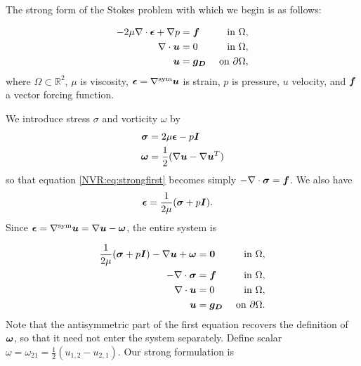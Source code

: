 The strong form of the Stokes problem with which we begin is as follows:

\begin{align}
- 2 \mu \NVRdiv \NVRtensor{\epsilon} + \NVRgrad p &= \vect{f} & \text{ in } \Omega, \label{NVR:eq:strongfirst} \\
\NVRdiv \vect{u} &= 0 & \text{ in } \Omega, \\
\vect{u} &= \vect{g_{D}} & \text{ on } \partial\Omega,\label{NVR:eq:stronglast}
\end{align}
where $\Omega \subset \mathbb{R}^{2}$, $\mu$ is viscosity, $\NVRtensor{\epsilon}=\NVRgrad^{\text{sym}} \vect{u}$ is strain, $p$ is pressure, $u$ velocity, and $\vect{f}$ a vector forcing function.

We introduce stress $\sigma$ and vorticity $\omega$ by
\begin{align*}
\NVRtensor{\sigma} &= 2 \mu \NVRtensor{\epsilon} - p\NVRtensor{I}\\
\NVRtensor{\omega} &= \frac{1}{2}(\NVRgrad \vect{u} - \NVRgrad \vect{u}^{T})
\end{align*}
so that equation \eqref{NVR:eq:strongfirst} becomes simply $-\NVRdiv \NVRtensor{\sigma} = \vect{f}$.
We also have
\begin{align*}
\NVRtensor{\epsilon} &= \frac{1}{2 \mu}(\NVRtensor{\sigma} + p\NVRtensor{I}).
\end{align*}
Since $\NVRtensor{\epsilon} = \NVRgrad^{\text{sym}} \vect{u} = \NVRgrad \vect{u} - \NVRtensor{\omega}$, the entire system is

\begin{align*}
\frac{1}{2 \mu}(\NVRtensor{\sigma} + p\NVRtensor{I}) - \NVRgrad \vect{u} + \NVRtensor{\omega} &= \NVRtensor{0}  & \text{ in } \Omega, \\
- \NVRdiv \NVRtensor{\sigma} &= \vect{f} & \text{ in } \Omega, \\
\NVRdiv \vect{u} &= 0 & \text{ in } \Omega, \\
\vect{u} &= \vect{g_{D}} & \text{ on } \partial\Omega.
\end{align*}
Note that the antisymmetric part of the first equation recovers the definition of $\NVRtensor{\omega}$, so that it need not enter the system separately.
Define scalar $\omega = \omega_{21} = \frac{1}{2}(u_{1,2} - u_{2,1})$.  Our strong formulation is

